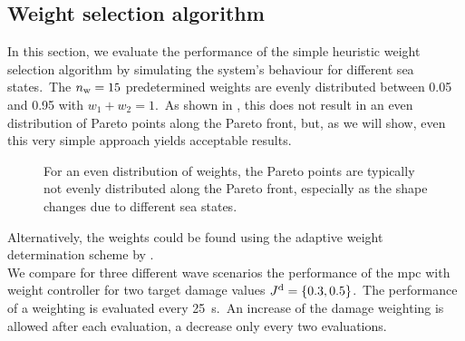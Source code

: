 \subsection{Weight selection algorithm}
In this section, we evaluate the performance of the simple heuristic weight selection algorithm by simulating the system's behaviour for different sea states.\ 
The $n_\mathrm{w}=15$ predetermined weights are evenly distributed between 0.05 and 0.95 with $w_1+w_2=1$.\ 
As shown in , this does not result in an even distribution of Pareto points along the Pareto front, but, as we will show, even this very simple approach yields acceptable results.\
\begin{figure}[htb]
	\centering
	\fontsize{8}{0}\selectfont
	\def\svgwidth{0.4\textwidth}
	
	\caption{For an even distribution of weights, the Pareto points are typically not evenly distributed along the Pareto front, especially as the shape changes due to different sea states.}
	\label{fig:PF}
\end{figure}

Alternatively, the weights could be found using the adaptive weight determination scheme by \cite{Ryu2019}.\
\\ 
We compare for three different wave scenarios the performance of the \ac{mpc} with weight controller for two target damage values $J^\mathrm{d} = \left\{0.3, 0.5\right\}$.\ 
The performance of a weighting is evaluated every \SI{25}{\second}.\ 
An increase of the damage weighting is allowed after each evaluation, a decrease only every two evaluations.
\begin{figure*}[htb]
\centering
\fontsize{8}{0}\selectfont
\def\svgwidth{0.97\textwidth}

\caption{Evaluation of the \ac{mpc} with weight controller for three wave scenarios and two target damage values.\ For clarity, only every 100th value is displayed. Top: Accumulated damage over time. Middle: The selected weight index \iw over time. A lower index corresponds to a higher weighting for the damage cost. Bottom: Extracted energy over time. For the lower damage thresholds, the extracted energy reduces only by 0.09, 0.05, and \SI{0.06}{\mega\joule} for the three cases, respectively.}
\label{fig:weight_control}
\end{figure*}


